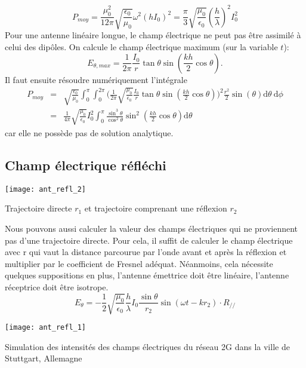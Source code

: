 \[P_{moy}=\frac{\mu_0^2}{12\pi}\sqrt{\frac{\epsilon_{0}}{\mu_0}}
\omega^2(hI_0)^2=\frac{\pi}{3}\sqrt{\frac{\mu_0}{\epsilon_{0}}}\left(\frac{h}{\lambda}\right)^2I_0^2
\]
Pour une antenne linéaire longue, le champ électrique ne peut pas être assimilé à celui des dipôles. On calcule le champ électrique maximum (sur la variable $t$):
\[E_{\theta,max}=\frac{1}{2\pi}\frac{I_0}{r}\tan \theta\sin\left(\frac{kh}{2}\cos\theta\right).\]
Il faut ensuite résoudre numériquement l'intégrale 
\begin{align*}
P_{moy}&=&\sqrt{\frac{\epsilon_{0}}{\mu_0}}\int_0^{\pi}\int_0^{2\pi}\bigg(\frac{1}{2\pi}\sqrt{\frac{\mu_0}{\epsilon_{0}}}\frac{I_0}{r}\tan \theta\sin\left(\frac{kh}{2}\cos\theta\right)\bigg)^2\frac{r^2}{2}\sin(\theta)\textrm{d}\theta\:\textrm{d}\phi\\
&=&\frac{1}{4\pi} \sqrt{\frac{\mu_0}{\epsilon_{0}}}I_0^2\int_0^{\pi}\frac{\sin^3\theta}{\cos^2\theta}\sin^2\left(\frac{kh}{2}\cos\theta\right)\textrm{d}\theta
\end{align*}
car elle ne possède pas de solution analytique.

\subsection{Champ électrique réfléchi}

\begin{marginfigure}[-2cm]
	\texttt{[image: ant\_refl\_2]}
	\caption{Trajectoire directe $r_1$ et trajectoire comprenant une réflexion $r_2$}
\end{marginfigure}
Nous pouvons aussi calculer la valeur des champs électriques qui ne proviennent pas d'une trajectoire directe. Pour cela, il suffit de calculer le champ électrique avec r qui vaut la distance parcourue par l'onde avant et après la réflexion et multiplier par le coefficient de Fresnel adéquat. Néanmoins, cela nécessite quelques suppositions en plus, l'antenne émettrice doit être linéaire, l'antenne réceptrice doit être isotrope.
\[E_\theta=-\frac{1}{2}\sqrt{\frac{\mu_0}{\epsilon_{0}}}\frac{h}{\lambda}I_0\frac{\sin \theta}{r_{2}}\sin(\omega t-kr_{2})\cdot R_{//}\]
\begin{marginfigure}[-2cm]
	\texttt{[image: ant\_refl\_1]}
	\caption{Simulation des intensités des champs électriques du réseau 2G dans la ville de Stuttgart, Allemagne}
\end{marginfigure} 

